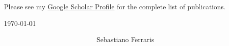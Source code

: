 \documentclass[10pt,A4,english]{article}
\begin{document}
\begin{paracol}{2}
\begin{rightcolumn}
\begin{itemize}[leftmargin=*]
\end{itemize}
\mbox{}
\vfill
Please see my \href{https://scholar.google.com/citations?user=1tAeAI0AAAAJ&hl=en}{Google Scholar Profile} for the complete list of publications.
\mbox{}
\vfill
\mbox{}
\vfill
\mbox{}
\vfill
\mbox{}
\vfill
\mbox{}
\vfill
\mbox{}
\vfill
\mbox{}
\vfill
\mbox{}
\vfill
\mbox{}
\vfill
\mbox{}
\vfill
\mbox{}
\vfill
\mbox{}
\vfill
\mbox{}
\vfill
\mbox{}
\vfill
\mbox{}


\today     \hspace{1cm}   \hrulefill

\hspace*{30mm}\phantom{Lorem, \today }~~~~~~~~~~~~~~~~~~~~~~~~~~~Sebastiano Ferraris

\end{rightcolumn}
\end{paracol}
\end{document}
